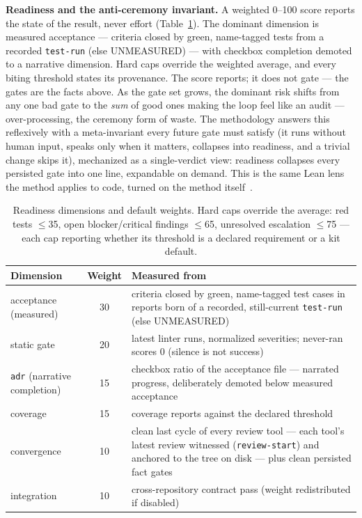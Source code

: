 \documentclass[11pt]{article}
\begin{document}
\textbf{Readiness and the anti-ceremony invariant.} A weighted 0--100 score
reports the state of the result, never effort (Table~\ref{tab:readiness}). The
dominant dimension is measured acceptance --- criteria closed by green,
name-tagged tests from a recorded \texttt{test-run} (else UNMEASURED) --- with checkbox completion demoted to a narrative
dimension. Hard caps override the weighted average, and every biting threshold
states its provenance. The score reports; it does not gate --- the gates are
the facts above. As the gate set grows, the dominant risk shifts from any one
bad gate to the \emph{sum} of good ones making the loop feel like an audit ---
over-processing, the ceremony form of waste. The methodology answers this
reflexively with a meta-invariant every future gate must satisfy (it runs
without human input, speaks only when it matters, collapses into readiness, and
a trivial change skips it), mechanized as a single-verdict view: readiness
collapses every persisted gate into one line, expandable on demand. This is the
same Lean lens the method applies to code, turned on the method
itself~\cite{poppendieck2006lean}.

\begin{table}[t]
\centering
\small
\begin{tabular}{@{}lcp{8.6cm}@{}}
\toprule
\textbf{Dimension} & \textbf{Weight} & \textbf{Measured from} \\
\midrule
acceptance (measured) & 30 & criteria closed by green, name-tagged test cases
in reports born of a recorded, still-current \texttt{test-run} (else UNMEASURED) \\
static gate & 20 & latest linter runs, normalized severities; never-ran scores
0 (silence is not success) \\
\texttt{adr} (narrative completion) & 15 & checkbox ratio of the acceptance
file --- narrated progress, deliberately demoted below measured acceptance \\
coverage & 15 & coverage reports against the declared threshold \\
convergence & 10 & clean last cycle of every review tool --- each tool's latest
review witnessed (\texttt{review-start}) and anchored to the tree on disk --- plus
clean persisted fact gates \\
integration & 10 & cross-repository contract pass (weight redistributed if
disabled) \\
\bottomrule
\end{tabular}
\caption{Readiness dimensions and default weights. Hard caps override the
average: red tests $\le$35, open blocker/critical findings $\le$65, unresolved
escalation $\le$75 --- each cap reporting whether its threshold is a declared
requirement or a kit default.}
\label{tab:readiness}
\end{table}
\end{document}
